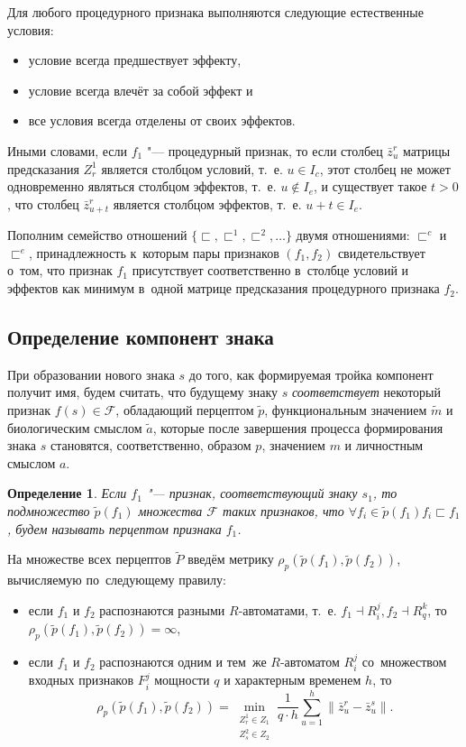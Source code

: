 \documentclass[a4paper, 12pt]{article}
\theoremstyle{plain}
\newtheorem{Def}{Определение}
\begin{document}
	Для любого процедурного признака выполняются следующие естественные условия:
	\begin{itemize}
		\item условие всегда предшествует эффекту,
		\item условие всегда влечёт за собой эффект и
		\item все условия всегда отделены от своих эффектов.
	\end{itemize}
		
	Иными словами, если $f_1$ "--- процедурный признак, то если столбец $\bar z_u^r$ матрицы предсказания $Z_r^1$ является столбцом условий, т.~е. $u\in{I_c}$, этот столбец не может одновременно являться столбцом эффектов, т.~е. $u\not\in I_e$, и существует такое $t>0$, что столбец $\bar z_{u+t}^r$ является столбцом эффектов, т.~е. $u+t\in I_e$.
		
	Пополним семейство отношений $\{\sqsubset,\sqsubset^1,\sqsubset^2,\dots\}$ двумя отношениями: $\sqsubset^c$ и $\sqsubset^e$, принадлежность к~которым пары признаков $(f_1,f_2)$ свидетельствует о~том, что признак $f_1$ присутствует соответственно в~столбце условий и эффектов как минимум в~одной матрице предсказания процедурного признака $f_2$.
		
	\subsection{Определение компонент знака}
	При образовании нового знака $s$ до того, как формируемая тройка компонент получит имя, будем считать, что будущему знаку $s$ \textit{соответствует} некоторый признак $f(s)\in\mathcal F$, обладающий перцептом $\tilde p$, функциональным значением $\tilde m$ и биологическим смыслом $\tilde a$, которые после завершения процесса формирования знака $s$ становятся, соответственно, образом $p$, значением $m$ и личностным смыслом $a$.
	
	\begin{Def}
		Если $f_1$ "--- признак, соответствующий знаку $s_1$, то подмножество $\tilde p(f_1)$ множества $\mathcal F$ таких признаков, что $\forall f_i\in\tilde p(f_1) f_i\sqsubset f_1$, будем называть перцептом признака $f_1$.
	\end{Def}
	
	На множестве всех перцептов $\tilde P$ введём метрику $\rho_p(\tilde p(f_1),\tilde p(f_2))$, вычисляемую по~следующему правилу:
	\begin{itemize}
		\item если $f_1$ и $f_2$ распознаются разными $R$-автоматами, т.~е. $f_1\dashv R_i^j, f_2\dashv R_q^k$, то $\rho_p(\tilde p(f_1),\tilde p(f_2))=\infty$,
		\item если $f_1$ и $f_2$ распознаются одним и тем~же $R$-автоматом $R_i^j$ со~множеством входных признаков $F_i^j$ мощности $q$ и характерным временем $h$, то
		\begin{equation}
			\rho_p(\tilde p(f_1),\tilde p(f_2))=\min\limits_{\substack{Z_r^1\in Z_1\\Z_s^2\in Z_2}}\frac{1}{q\cdot h}\sum\limits_{u=1}^h\|\bar z_u^r-\bar z_u^s\|.
		\end{equation} 
	\end{itemize}
	
\end{document}
